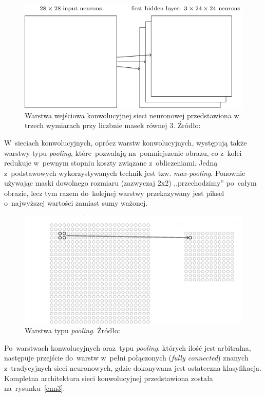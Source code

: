 \begin{figure}[ht!]
\centering
\includegraphics[scale=0.6]{res/cnn2.png}
\caption[Caption for LOF]{Warstwa wejściowa konwolucyjnej sieci neuronowej przedstawiona w trzech wymiarach przy liczbnie masek równej 3. Źródło:\cite{nielsen}\label{cnn2}} 
\end{figure}
\noindent
W~sieciach konwolucyjnych, oprócz warstw konwolucyjnych, występują także warstwy typu \textit{pooling}, które~pozwalają na~pomniejszenie obrazu, co z~kolei redukuje w~pewnym stopniu koszty związane z~obliczeniami. Jedną z~podstawowych wykorzystywanych technik jest tzw. \textit{max-pooling}. Ponownie używając maski dowolnego rozmiaru (zazwyczaj 2x2) ,,przechodzimy'' po~całym obrazie, lecz tym razem do~kolejnej warstwy przekazywany jest piksel o~najwyższej wartości zamiast sumy ważonej.
\begin{figure}[ht!]
\centering
\includegraphics[scale=0.6]{res/pooling.png}
\caption[Caption for LOF]{Warstwa typu \textit{pooling}. Źródło:\cite{nielsen}\label{pooling}} 
\end{figure}
\noindent
Po~warstwach konwolucyjnych oraz~typu \textit{pooling}, których ilość jest arbitralna, następuje przejście do~warstw w~pełni połączonych (\textit{fully connected}) znanych z~tradycyjnych sieci neuronowych, gdzie dokonywana jest ostateczna klasyfikacja. Kompletna architektura sieci konwolucyjnej przedstawiona została na~rysunku~\ref{cnn3}.

